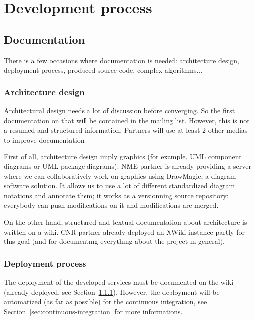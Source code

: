 \chapter{Development process}
\label{ch:development-process}

\section{Documentation}
\label{sec:documentation}

There is a few occasions where documentation is needed: architecture design, deployment process,
produced source code, complex algorithms...

\subsection{Architecture design}
\label{sec:architecture-design}

Architectural design needs a lot of discussion before converging.
So the first documentation on that will be contained in the mailing list.
However, this is not a resumed and structured information.
Partners will use at least 2 other medias to improve documentation.

First of all, architecture design imply graphics (for example, UML component diagrams or UML
package diagrams). NME partner is already providing a server where we can collaboratively work
on graphics using DrawMagic, a diagram software solution. It allows us to use a lot of different
standardized diagram notations and annotate them; it works as a versionning source repository:
everybody can push modifications on it and modifications are merged.

On the other hand, structured and textual documentation about architecture is written on a wiki.
CNR partner already deployed an XWiki instance partly for this goal (and for documenting everything
about the \learnpad project in general).

\subsection{Deployment process}
\label{sec:deployment-process}

The deployment of the developed services must be documented on the wiki (already deployed, see
Section~\ref{sec:architecture-design}).
However, the deployment will be automatized (as far as possible) for the continuous integration,
see Section~\ref{sec:continuous-integration} for more informations.

